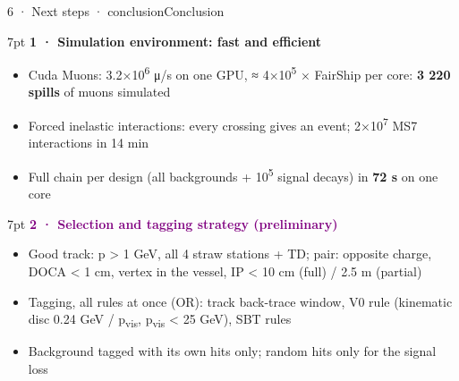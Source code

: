 \begin{btframe}{6 · Next steps · conclusion}{Conclusion}
\noindent\begin{minipage}[t]{0.49\linewidth}\vspace{0pt}
\begin{mathbox}[cern]{7pt}
{\fontsize{8.6pt}{10pt}\selectfont\textbf{\textcolor{cern}{1 · Simulation environment: fast and efficient}}}\par\vspace{2pt}
\begin{itemize}\setlength{\itemsep}{3pt}
  \item Cuda Muons: 3.2×10\textsuperscript{6} μ/s on one GPU, ≈ 4×10\textsuperscript{5} × FairShip per core: \textbf{3 220 spills} of muons simulated
  \item Forced inelastic interactions: every crossing gives an event; 2×10\textsuperscript{7} MS7 interactions in 14 min
  \item Full chain per design (all backgrounds + 10\textsuperscript{5} signal decays) in \textbf{72 s} on one core
\end{itemize}
\end{mathbox}
\end{minipage}\hfill\begin{minipage}[t]{0.49\linewidth}\vspace{0pt}
\begin{mathbox}[purple]{7pt}
{\fontsize{8.6pt}{10pt}\selectfont\textbf{\textcolor{purple}{2 · Selection and tagging strategy (preliminary)}}}\par\vspace{2pt}
\begin{itemize}\setlength{\itemsep}{3pt}
  \item Good track: p > 1 GeV, all 4 straw stations + TD; pair: opposite charge, DOCA < 1 cm, vertex in the vessel, IP < 10 cm (full) / 2.5 m (partial)
  \item Tagging, all rules at once (OR): track back-trace window, V0 rule (kinematic disc 0.24 GeV / p\textsubscript{vis}, p\textsubscript{vis} < 25 GeV), SBT rules
  \item Background tagged with its own hits only; random hits only for the signal loss
\end{itemize}
\end{mathbox}
\end{minipage}
\vspace{10pt}
\noindent\begin{minipage}[t]{0.49\linewidth}\vspace{0pt}

\end{minipage}
\end{btframe}
